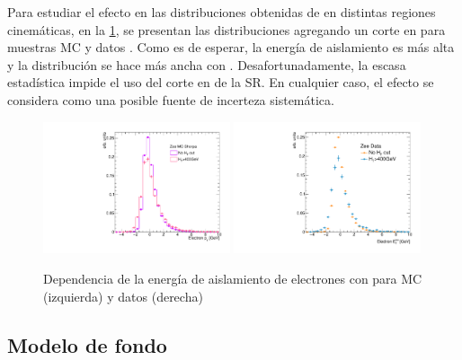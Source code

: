 

Para estudiar el efecto en las distribuciones obtenidas de {\Zee} en distintas
regiones cinemáticas, en la \cref{fig:electron_iso_HT}, se presentan las
distribuciones agregando un corte en {\HT} para muestras MC y datos {\Zee}. Como
es de esperar, la energía de aislamiento es más alta y la distribución se hace
más ancha con \HT.
Desafortunadamente, la escasa estadística impide el uso del corte en {\HT} de la
SR. En cualquier caso, el efecto se considera como una posible fuente de
incerteza sistemática.

\begin{figure}[!htbp]
  \centering

  \includegraphics[width=0.49\textwidth]{figures/electron_iso_ZeeHMC_corr}
  \includegraphics[width=0.49\textwidth]{figures/electron_iso_ZeeH_corr}

  \caption{Dependencia de la energía de aislamiento de electrones con {\HT}
    para MC (izquierda) y datos (derecha) \Zee}
    \label{fig:electron_iso_HT}

\end{figure}



\subsection{Modelo de fondo} \label{sec:jfake_bkg_template}

